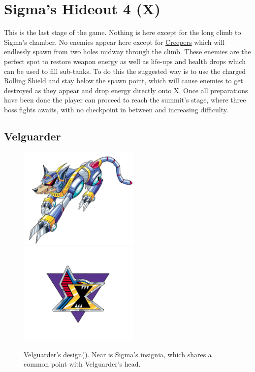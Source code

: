 \section{Sigma's Hideout 4 (X)}
This is the last stage of the game. Nothing  is here except for the long climb to Sigma's chamber. No enemies appear here except for \hyperlink{enem:Creeper}{Creepers} which will endlessly spawn from two holes midway through the climb. These enemies are the perfect spot to restore weapon energy as well as life-ups and health drops which can be used to fill sub-tanks. To do this the suggested way is to use the charged Rolling Shield and stay below the spawn point, which will cause enemies to get destroyed as they appear and drop energy directly onto X. Once all preparations have been done the player can proceed to reach the summit's stage, where three boss fights awaits, with no checkpoint in between and increasing difficulty.

\subsection{Velguarder}\label{boss:Velguarder}
\begin{figure}[htp]
	\centering
	\includegraphics[height=5cm]{figures/X1/Sigma_stages/Velguarder.jpg}
	\includegraphics[height=5cm]{figures/X1/Sigma_stages/Sigma_logo.png}
	\caption{Velguarder's design(\cite{book:MMX_Complete_art}). Near is Sigma's insignia, which shares a common point with Velguarder's head.}
\end{figure}



